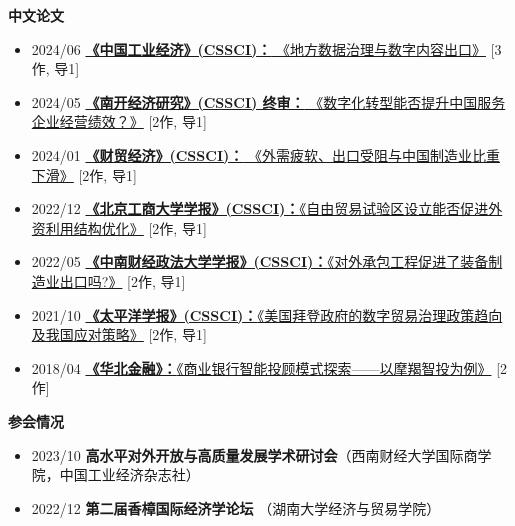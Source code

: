\documentclass[11pt]{article}
\begin{document}
	\textbf{中文论文}
	\begin{itemize}
		\item 2024/06 \quad
		\href{}{\textbf{《中国工业经济》(CSSCI)：} 《地方数据治理与数字内容出口》} [3作, 导1]
		
		\item 2024/05 \quad
		\href{}{\textbf{《南开经济研究》(CSSCI) 终审：} 《数字化转型能否提升中国服务企业经营绩效？》}  [2作, 导1]
		
		\item 2024/01 \quad
		\href{https://mengke25.github.io/files/paper/p2024a.pdf}{\textbf{《财贸经济》(CSSCI)：} 《外需疲软、出口受阻与中国制造业比重下滑》} [2作, 导1]
		
		\item 2022/12 \quad
		\href{https://mengke25.github.io/files/paper/p2022b.pdf}{\textbf{《北京工商大学学报》(CSSCI)：}《自由贸易试验区设立能否促进外资利用结构优化》}  [2作, 导1]
		
		\item 2022/05 \quad
		\href{https://mengke25.github.io/files/paper/p2022a.pdf}{\textbf{《中南财经政法大学学报》(CSSCI)：}《对外承包工程促进了装备制造业出口吗?》}  [2作, 导1]
		
		
		\item 2021/10 \quad
		\href{https://mengke25.github.io/files/paper/p2021a.pdf}{\textbf{《太平洋学报》(CSSCI)：}《美国拜登政府的数字贸易治理政策趋向及我国应对策略》}  [2作, 导1]
		
		\item 2018/04 \quad
		\href{https://mengke25.github.io/files/paper/p2018a.pdf}{\textbf{《华北金融》：}《商业银行智能投顾模式探索——以摩羯智投为例》}  [2作]
		
	\end{itemize}
	
	\textbf{参会情况}
	\begin{itemize}
		\item 2023/10 \quad
		\textbf{高水平对外开放与高质量发展学术研讨会}（西南财经大学国际商学院，中国工业经济杂志社）
		\item 2022/12 \quad
		\textbf{第二届香樟国际经济学论坛} \quad （湖南大学经济与贸易学院）
	\end{itemize}
	
\end{document}
